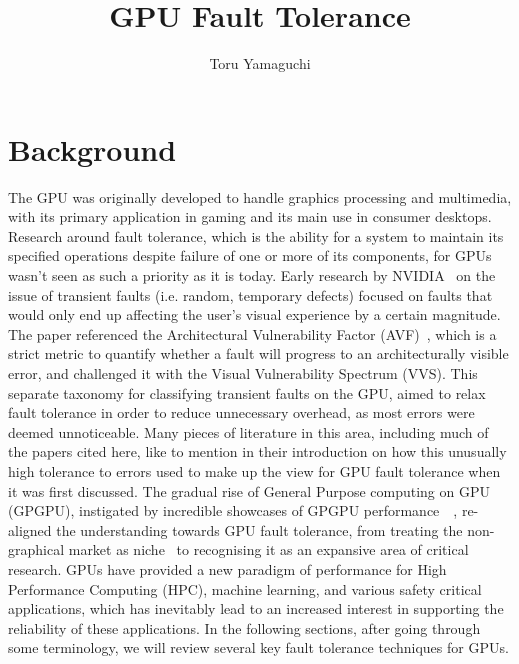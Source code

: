\documentclass{article}
\title{GPU Fault Tolerance}
\author{Toru Yamaguchi}
\date{}
\begin{document}
\maketitle
\vspace{-4em}
\section{Background}
The GPU was originally developed to handle graphics processing and multimedia, with its primary application in gaming and its main use in consumer desktops. Research around fault tolerance, which is the ability for a system to maintain its specified operations despite failure of one or more of its components, for GPUs wasn't seen as such a priority as it is today. Early research by NVIDIA~\cite{1} on the issue of transient faults (i.e. random, temporary defects) focused on faults that would only end up affecting the user's visual experience by a certain magnitude. The paper referenced the Architectural Vulnerability Factor (AVF)~\cite{1253181}, which is a strict metric to quantify whether a fault will progress to an architecturally visible error, and challenged it with the Visual Vulnerability Spectrum (VVS). This separate taxonomy for classifying transient faults on the GPU, aimed to relax fault tolerance in order to reduce unnecessary overhead, as most errors were deemed unnoticeable. Many pieces of literature in this area, including much of the papers cited here, like to mention in their introduction on how this unusually high tolerance to errors used to make up the view for GPU fault tolerance when it was first discussed. The gradual rise of General Purpose computing on GPU (GPGPU), instigated by incredible showcases of GPGPU performance~\cite{5446251}~\cite{4490127}, re-aligned the understanding towards GPU fault tolerance, from treating the non-graphical market as niche~\cite{2} to recognising it as an expansive area of critical research. GPUs have provided a new paradigm of performance for High Performance Computing (HPC), machine learning, and various safety critical applications, which has inevitably lead to an increased interest in supporting the reliability of these applications. In the following sections, after going through some terminology, we will review several key fault tolerance techniques for GPUs.
\end{document}
